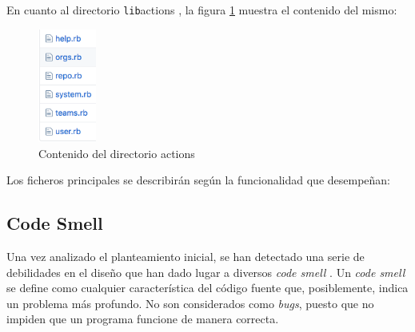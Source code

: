 En cuanto al directorio \verb /lib/actions , la figura \ref{fig:actions} muestra el contenido del mismo:
\begin{figure}[H]
  \begin{center}
  \includegraphics[width=0.17\textwidth]{images/actions}
  \caption{Contenido del directorio actions}
  \label{fig:actions}
  \end{center}
\end{figure}
\bigskip

Los ficheros principales se describirán según la funcionalidad que desempeñan:
\bigskip
\subsection{Code Smell}
\label{2.1.3}
Una vez analizado el planteamiento inicial, se han detectado una serie de debilidades en el diseño que han dado lugar a diversos {\it code smell} \cite{B11}.
Un {\it code smell} se define como cualquier característica del código fuente que, posiblemente, indica un problema más profundo. No son considerados como {\it bugs}, puesto que no impiden que un programa funcione de manera correcta.
\bigskip

